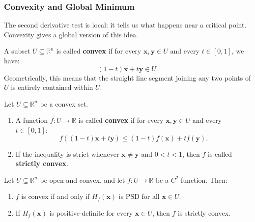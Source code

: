 \subsubsection*{Convexity and Global Minimum}

The second derivative test is local: it tells us what happens near a critical point. Convexity gives a global version of this idea.

\begin{definition}
	A subset $U \subseteq \mathbb{R}^n$ is called \textbf{convex} if for every $\mathbf{x}, \mathbf{y} \in U$ and every $t \in [0, 1]$, we have:
	$$
		(1-t)\mathbf{x} + t\mathbf{y} \in U.
	$$
	Geometrically, this means that the straight line segment joining any two points of $U$ is entirely contained within $U$.
\end{definition}

\begin{definition}
	Let $U \subseteq \mathbb{R}^n$ be a convex set.
	\begin{enumerate}
		\item A function $f: U \to \mathbb{R}$ is called \textbf{convex} if for every $\mathbf{x}, \mathbf{y} \in U$ and every $t \in [0,1]$:
		      $$
			      f((1-t)\mathbf{x} + t\mathbf{y}) \le (1-t)f(\mathbf{x}) + tf(\mathbf{y}).
		      $$
		\item If the inequality is strict whenever $\mathbf{x} \ne \mathbf{y}$ and $0 < t < 1$, then $f$ is called \textbf{strictly convex}.
	\end{enumerate}
\end{definition}

\begin{theorem}
	Let $U \subseteq \mathbb{R}^n$ be open and convex, and let $f: U \to \mathbb{R}$ be a $C^2$-function. Then:
	\begin{enumerate}
		\item $f$ is convex if and only if $H_f(\mathbf{x})$ is PSD for all $\mathbf{x} \in U$.
		\item If $H_f(\mathbf{x})$ is positive-definite for every $\mathbf{x} \in U$, then $f$ is strictly convex.
	\end{enumerate}
\end{theorem}

